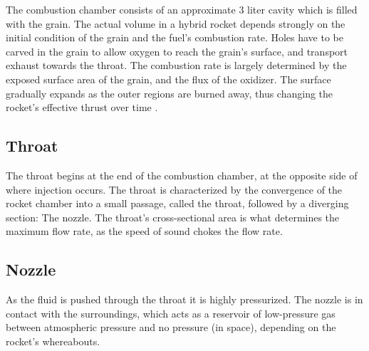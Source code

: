 	The combustion chamber consists of an approximate 3 liter cavity which is filled with the grain. The actual volume in a hybrid rocket depends strongly on the initial condition of the grain and the fuel's combustion rate. Holes have to be carved in the grain to allow oxygen to reach the grain's surface, and transport exhaust towards the throat. The combustion rate is largely determined by the exposed surface area of the grain, and the flux of the oxidizer. The surface gradually expands as the outer regions are burned away, thus changing the rocket's effective thrust over time \cite[chapter 12, p.~174]{ignition}. 

\subsection{Throat}

	The throat begins at the end of the combustion chamber, at the opposite side of where injection occurs. The throat is characterized by the convergence of the rocket chamber into a small passage, called the throat, followed by a diverging section: The nozzle. The throat's cross-sectional area is what determines the maximum flow rate, as the speed of sound chokes the flow rate.
	
\subsection{Nozzle}

	As the fluid is pushed through the throat it is highly pressurized. The nozzle is in contact with the surroundings, which acts as a reservoir of low-pressure gas between atmospheric pressure %
	and no pressure (in space), depending on the rocket's whereabouts.